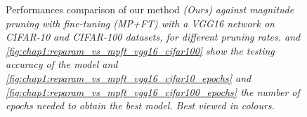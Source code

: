 \begin{figure}


  \caption{ Performances comparison of our method \em{(Ours)} against
    magnitude pruning with fine-tuning \em{(MP+FT)} with a VGG16 network on
    CIFAR-10 and CIFAR-100 datasets, for different pruning rates.
     and
    \cref{fig:chap1:reparam_vs_mpft_vgg16_cifar100} show the testing accuracy of
    the model and \cref{fig:chap1:reparam_vs_mpft_vgg16_cifar10_epochs} and
    \cref{fig:chap1:reparam_vs_mpft_vgg16_cifar100_epochs} the
    number of epochs needed to obtain the best model. Best viewed in colours.}
  \label{fig:chap1:reparam_vs_mpft_vgg16}
\end{figure}

